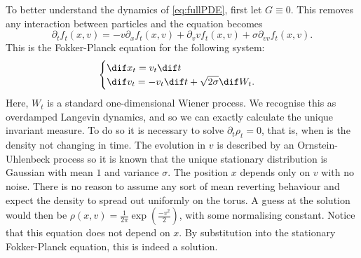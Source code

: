 		To better understand the dynamics of \eqref{eq:fullPDE}, first let $G\equiv0$. This removes any interaction between particles and the equation becomes
		\begin{equation}\label{eq:OUFPE}
			\partial_t f_t(x,v) = -v\partial_x f_t(x,v) +\partial_v vf_t(x,v) + \sigma \partial_{vv}f_t(x,v).
		\end{equation}
		This is the Fokker-Planck equation for the following system:
		\begin{equation}\label{eq:2dOU}\begin{cases}
			\dif x_t = v_t\dif t\\
			\dif v_t = -v_t\dif t + \sqrt{2\sigma} \dif W_t. 
		\end{cases}	\end{equation}
		Here, $W_t$ is a standard one-dimensional Wiener process. We recognise this as overdamped Langevin dynamics, and so we can exactly calculate the unique invariant measure. To do so it is necessary to solve $\partial_t \rho_t = 0$, that is, when is the density not changing in time. The evolution in $v$ is described by an Ornstein-Uhlenbeck process so it is known that the unique stationary distribution is Gaussian with mean $1$ and variance $\sigma$. The position $x$ depends only on $v$ with no noise. There is no reason to assume any sort of mean reverting behaviour and expect the density to spread out uniformly on the torus. A guess at the solution would then be $\rho (x,v) = \frac{1}{2\pi}\exp(\frac{-v^2}{2})$, with some normalising constant. Notice that this equation does not depend on $x$. By substitution into the stationary Fokker-Planck equation, this is indeed a solution.
        
